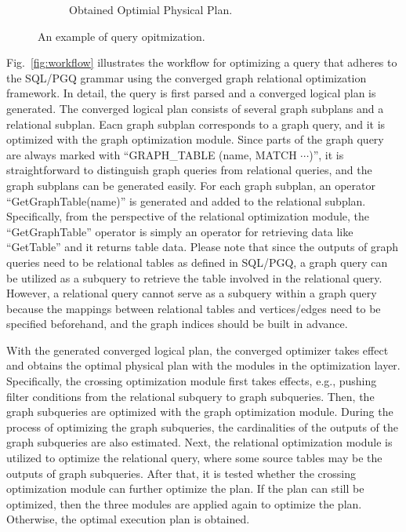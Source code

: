 \begin{figure}
\begin{subfigure}[b]{0.4\linewidth}
        \caption{Obtained Optimial Physical Plan.}
        \label{fig:physical-plan-optimized}
    \end{subfigure}
    \caption{An example of query opitmization.}
    \label{fig:query-grtree-example}
\end{figure}


Fig.~\ref{fig:workflow} illustrates the workflow for optimizing a query that adheres to the SQL/PGQ grammar using the converged graph relational optimization framework.
In detail, the query is first parsed and a converged logical plan is generated.
The converged logical plan consists of several graph subplans and a relational subplan.
Eacn graph subplan corresponds to a graph query, and it is optimized with the graph optimization module.
Since parts of the graph query are always marked with ``GRAPH\_TABLE (name, MATCH $\cdots$)'', it is straightforward to distinguish graph queries from relational queries, and the graph subplans can be generated easily.
For each graph subplan, an operator ``GetGraphTable(name)'' is generated and added to the relational subplan.
Specifically, from the perspective of the relational optimization module, the ``GetGraphTable'' operator is simply an operator for retrieving data like ``GetTable'' and it returns table data.
Please note that since the outputs of graph queries need to be relational tables as defined in SQL/PGQ, a graph query can be utilized as a subquery to retrieve the table involved in the relational query.
However, a relational query cannot serve as a subquery within a graph query because the mappings between relational tables and vertices/edges need to be specified beforehand, and the graph indices should be built in advance.


With the generated converged logical plan, the converged optimizer takes effect and obtains the optimal physical plan with the modules in the optimization layer.
Specifically, the crossing optimization module first takes effects, e.g., pushing filter conditions from the relational subquery to graph subqueries.
Then, the graph subqueries are optimized with the graph optimization module.
During the process of optimizing the graph subqueries, the cardinalities of the outputs of the graph subqueries are also estimated.
Next, the relational optimization module is utilized to optimize the relational query, where some source tables may be the outputs of graph subqueries.
After that, it is tested whether the crossing optimization module can further optimize the plan.
If the plan can still be optimized, then the three modules are applied again to optimize the plan.
Otherwise, the optimal execution plan is obtained.

